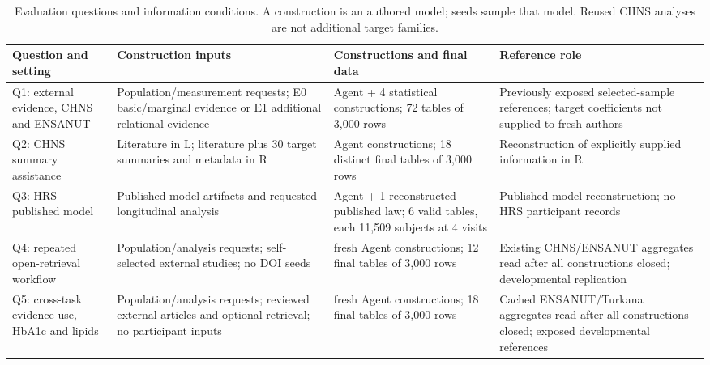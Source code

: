 \documentclass[10pt,twocolumn]{article}
\begin{document}
\begin{table}[t]

\caption{Evaluation questions and information conditions. A construction is an authored model; seeds sample that model. Reused CHNS analyses are not additional target families.}

\label{tab:1}

\centering\fontsize{8}{9.5}\selectfont

\setlength{\tabcolsep}{4pt}

\renewcommand{\arraystretch}{1.12}

\begin{tabularx}{\textwidth}{@{}>{\raggedright\arraybackslash}X>{\raggedright\arraybackslash}X>{\raggedright\arraybackslash}X>{\raggedright\arraybackslash}X@{}}

\toprule

Question and setting & Construction inputs & Constructions and final data & Reference role \\

\midrule

Q1: external evidence, CHNS and ENSANUT & Population/measurement requests; E0 basic/marginal evidence or E1 additional relational evidence & 20 Agent + 4 statistical constructions; 72 tables of 3,000 rows & Previously exposed selected-sample references; target coefficients not supplied to fresh authors \\

Q2: CHNS summary assistance & Literature in L; literature plus 30 target summaries and metadata in R & 6 Agent constructions; 18 distinct final tables of 3,000 rows & Reconstruction of explicitly supplied information in R \\

Q3: HRS published model & Published model artifacts and requested longitudinal analysis & 1 Agent + 1 reconstructed published law; 6 valid tables, each 11,509 subjects at 4 visits & Published-model reconstruction; no HRS participant records \\

Q4: repeated open-retrieval workflow & Population/analysis requests; self-selected external studies; no DOI seeds & 4 fresh Agent constructions; 12 final tables of 3,000 rows & Existing CHNS/ENSANUT aggregates read after all constructions closed; developmental replication \\

Q5: cross-task evidence use, HbA1c and lipids & Population/analysis requests; reviewed external articles and optional retrieval; no participant inputs & 6 fresh Agent constructions; 18 final tables of 3,000 rows & Cached ENSANUT/Turkana aggregates read after all constructions closed; exposed developmental references \\


\end{tabularx}
\end{table}
\end{document}
